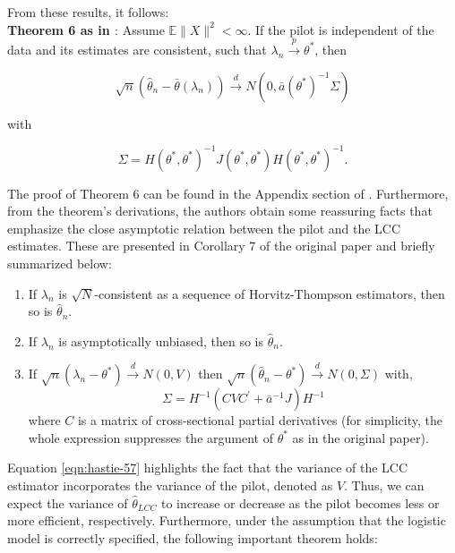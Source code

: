 From these results, it follows:\\

\textbf{Theorem 6 as in \textcite{hastie2014}}: Assume $\mathbb{E}\|X\|^2<\infty$. If the pilot is independent of the data and its estimates are consistent, such that $\lambda_n \stackrel{p}{\rightarrow} \theta^*$, then

\begin{equation}
    \sqrt{n}\left(\hat{\theta}_n-\bar{\theta}\left(\lambda_n\right)\right) \stackrel{d}{\rightarrow} N\left(0, \bar{a}\left(\theta^*\right)^{-1} \Sigma\right)   
\end{equation}

with 

\begin{equation}
    \Sigma=H\left(\theta^*, \theta^*\right)^{-1} J\left(\theta^*, \theta^*\right) H\left(\theta^*, \theta^*\right)^{-1}.
\end{equation}

The proof of Theorem 6 can be found in the Appendix section of \textcite{hastie2014}. Furthermore, from the theorem's derivations, the authors obtain some reassuring facts that emphasize the close asymptotic relation between the pilot and the LCC estimates. These are presented in Corollary 7 of the original paper and briefly summarized below:

\begin{enumerate}
    \item If $\lambda_n$ is $\sqrt{N}$-consistent as a sequence of Horvitz-Thompson estimators, then so is $\hat{\theta}_n$.
    \item If $\lambda_n$ is asymptotically unbiased, then so is $\hat{\theta}_n$.
    \item If $\sqrt{n}\left(\lambda_n-\theta^*\right) \stackrel{d}{\rightarrow} N(0, V)$ then $\sqrt{n}\left(\hat{\theta}_n-\theta^*\right) \stackrel{d}{\rightarrow} N(0, \Sigma)$ with,
    \begin{equation}
        \Sigma=H^{-1}\left(C V C^{\prime}+\bar{a}^{-1} J\right) H^{-1}
        \label{eqn:hastie-57}
    \end{equation}
    where $C$ is a matrix of cross-sectional partial derivatives (for simplicity, the whole expression suppresses the argument of $\theta^*$ as in the original paper). 
\end{enumerate}

Equation \ref{eqn:hastie-57} highlights the fact that the variance of the LCC estimator incorporates the variance of the pilot, denoted as $V$. Thus, we can expect the variance of $\hat{\theta}_{LCC}$ to increase or decrease as the pilot becomes less or more efficient, respectively. Furthermore, under the assumption that the logistic model is correctly specified, the following important theorem holds:\\

